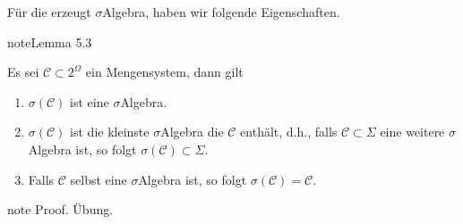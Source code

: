 \documentclass[letterpaper,10pt,german]{jupyterBook}
\begin{document}
\sphinxAtStartPar
Für die erzeugt \(\sigma\)\sphinxhyphen{}Algebra, haben wir folgende Eigenschaften.
\label{masstheorie/masstheorie:lemma-8}
\begin{sphinxadmonition}{note}{Lemma 5.3}



\sphinxAtStartPar
Es sei \(\mathcal{C}\subset 2^\Omega\) ein Mengensystem, dann gilt
\begin{enumerate}
%
\item {} 
\sphinxAtStartPar
\(\sigma(\mathcal{C})\) ist eine \(\sigma\)\sphinxhyphen{}Algebra.

\item {} 
\sphinxAtStartPar
\(\sigma(\mathcal{C})\) ist die kleinste \(\sigma\)\sphinxhyphen{}Algebra die \(\mathcal{C}\) enthält, d.h., falls \(\mathcal{C}\subset\Sigma\) eine weitere \(\sigma\)\sphinxhyphen{}Algebra ist, so folgt \(\sigma(\mathcal{C})\subset\Sigma\).

\item {} 
\sphinxAtStartPar
Falls \(\mathcal{C}\) selbst eine \(\sigma\)\sphinxhyphen{}Algebra ist, so folgt \(\sigma(\mathcal{C}) = \mathcal{C}\).

\end{enumerate}
\end{sphinxadmonition}

\begin{sphinxadmonition}{note}
\sphinxAtStartPar
Proof. Übung.
\end{sphinxadmonition}
\end{document}
